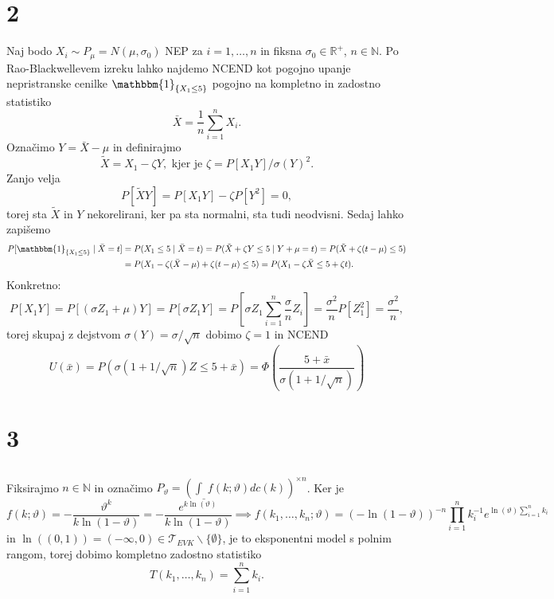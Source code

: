 \documentclass[ letterpaper, titlepage, fleqn]{article}
\newcommand{\R}{\mathbb R}
\newcommand{\N}{\mathbb N}
\newcommand{\T}{\mathscr T}
\newcommand{\ind}{\mathbbm{1}}
\begin{document}
\section{2}
Naj bodo $X_i \sim P_\mu = N(\mu, \sigma_0)$ NEP za $i=1,\dots,n$ in fiksna $\sigma_0 \in \R^+$, $n\in\N$. Po Rao-Blackwellevem izreku lahko najdemo NCEND kot pogojno upanje nepristranske cenilke $\ind_{\{X_1 \leq 5\}}$  pogojno na kompletno in zadostno statistiko
$$\bar{X} = \frac{1}{n} \sum_{i=1}^n X_i.$$
Označimo $Y = \bar{X} - \mu$ in definirajmo
$$\tilde{X} = X_1 - \zeta Y, \text{ kjer je } \zeta = P[X_1Y] / \sigma(Y)^2.$$
Zanjo velja
$$P[\tilde{X}Y] = P[X_1Y] - \zeta P[Y^2] = 0,$$
torej sta $\tilde{X}$ in $Y$ nekorelirani, ker pa sta normalni, sta tudi neodvisni. 
Sedaj lahko zapišemo
\begin{equation*}
\begin{aligned}
P[\ind_{\{X_1 \leq 5\}} \mid \bar{X} = t] &= P(X_1 \leq 5 \mid \bar{X} = t) 
= P(\tilde{X} + \zeta Y \leq 5 \mid Y + \mu = t) = P(\tilde{X} + \zeta (t - \mu) \leq 5) \\
&= P(X_1 - \zeta (\bar{X} - \mu) + \zeta(t - \mu) \leq 5) = P(X_1 - \zeta \bar{X} \leq 5 + \zeta t).
\end{aligned}
\end{equation*}
Konkretno:
\begin{equation*}
P[X_1Y] = P[(\sigma Z_1 + \mu)Y] = P[\sigma Z_1 Y] = P[\sigma Z_1 \sum_{i=1}^n \frac{\sigma}{n} Z_i] = \frac{\sigma^2}{n} P[Z_1^2]  = \frac{\sigma^2}{n},
\end{equation*}
torej skupaj z dejstvom $\sigma(Y) = \sigma / \sqrt{n}$ dobimo $\zeta = 1$ in NCEND
$$U(\bar{x}) = P(\sigma (1 + 1/\sqrt{n})Z \leq 5 + \bar{x}) = \Phi\left(\frac{5 + \bar{x}}{\sigma(1 + 1/\sqrt{n})}\right)$$

\section{3}
\subsection{}
Fiksirajmo $n\in\N$ in označimo $P_\vartheta = \left(\int_{\_} f(k; \vartheta) dc(k)\right)^{\times n}$. Ker je
$$
f(k; \vartheta) = -\frac{\vartheta^k}{k\ln(1-\vartheta)} = -\frac{e^{k\ln(\vartheta)}}{k\ln(1-\vartheta)} \implies 
f(k_1, \dots, k_n; \vartheta) = (-\ln(1-\vartheta))^{-n} \prod_{i=1}^n k_i^{-1} e^{\ln(\vartheta) \sum_{i=1}^n k_i}
$$
in $\ln((0,1))  = (-\infty, 0) \in \T_{EVK} \smallsetminus \{\emptyset\}$, je to eksponentni model s polnim rangom, 
torej dobimo kompletno zadostno statistiko 
$$T(k_1, \dots, k_n) = \sum_{i=1}^n k_i.$$
\end{document}
